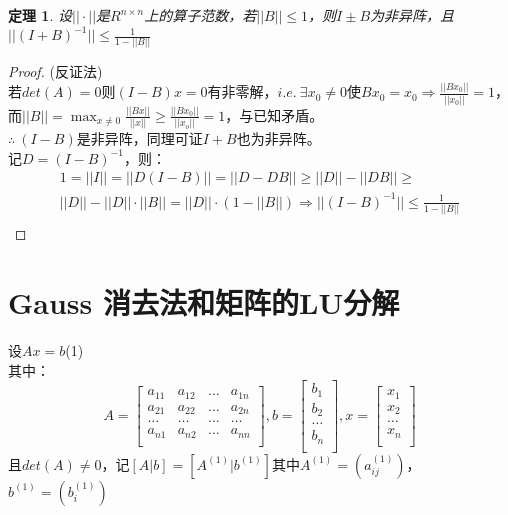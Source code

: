 \documentclass[a4paper]{article}
\newtheorem{theorem}{定理}[section]
\begin{document}
\begin{theorem}
\label{theorem_43}
设$||\cdot||$是$R^{n\times n}$上的算子范数，若$||B||\le 1$，则$I \pm B$为非异阵，且$||(I+B)^{-1}||\le \frac{1}{1-||B||}$
\end{theorem}

\begin{proof}
 (反证法)\\
若$det(A)=0$则$(I-B)x=0$有非零解，$i.e. \ \exists x_0 \neq 0 {\text{使}} Bx_0 = x_0 \Rightarrow \frac{||Bx_0||}{||x_0||}=1$，而$||B||=\max_{x\neq 0}\frac{||Bx||}{||x||}\ge \frac{||Bx_0||}{||x_o||}=1$，与已知矛盾。\\
$\therefore \ (I-B)$是非异阵，同理可证$I+B$也为非异阵。\\
记$D=(I-B)^{-1}$，则：
$$
\begin{array}{lr}
1 = ||I|| = ||D(I-B)|| = ||D-DB||\ge ||D|| - ||DB|| \ge \\ 
||D|| - ||D||\cdot ||B|| = ||D||\cdot(1-||B||) \Rightarrow ||(I-B)^{-1}|| \le \frac{1}{1-||B||} \\
\end{array}$$
\end{proof}

\section{Gauss 消去法和矩阵的LU分解}
设$Ax=b$\hfill (1)\\
其中：
$$A=\left[
\begin{matrix}
a_{11} & a_{12} & \dots & a_{1n} \\
a_{21} & a_{22} & \dots & a_{2n} \\ 
\dots & \dots & \dots & \dots \\
a_{n1} & a_{n2} & \dots & a_{nn} \\
\end{matrix} \right],
b = \left[ 
\begin{matrix}
b_1 \\ b_2 \\ \dots \\ b_n \\
\end{matrix}
\right],
x = \left[ 
\begin{matrix}
x_1 \\ x_2 \\ \dots \\ x_n \\
\end{matrix}
\right]
$$
且$det(A) \neq 0$，记$[A|b] = [A^{(1)}|b^{(1)}]$其中$A^{(1)} = (a_{ij}^{(1)})$，$b^{(1)}=(b_{i}^{(1)})$
\end{document}
